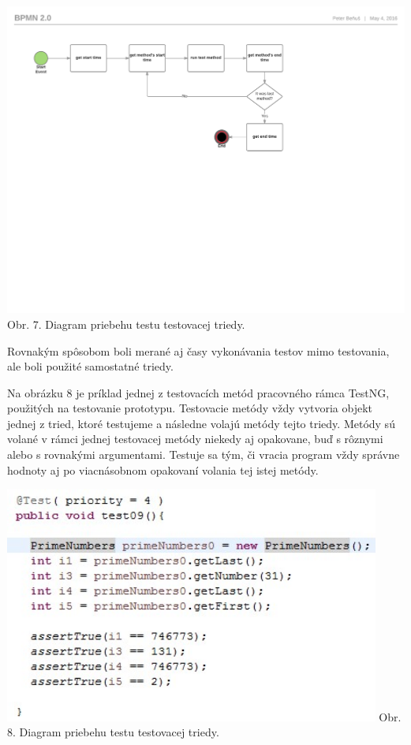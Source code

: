 \documentclass[11pt,twoside,slovak,a4paper]{article}
\begin{document}
 	\begin{center}
 		\includegraphics[width = 500pt, trim = 0pt 315pt 0pt 40pt, clip]{listener}
 		\newline
 		\tiny Obr. 7. Diagram priebehu testu testovacej triedy.
 	\end{center}
 	
 	Rovnakým spôsobom boli merané aj časy vykonávania testov mimo testovania, ale boli použité samostatné triedy.
 	
 	Na obrázku 8 je príklad jednej z testovacích metód pracovného rámca TestNG, použitých na testovanie prototypu. Testovacie metódy vždy vytvoria objekt jednej z tried, ktoré testujeme a následne volajú metódy tejto triedy. Metódy sú volané v rámci jednej testovacej metódy niekedy aj opakovane, buď s rôznymi alebo s rovnakými argumentami. Testuje sa tým, či vracia program vždy správne hodnoty aj po viacnásobnom opakovaní volania tej istej metódy.
 	
 	\begin{center}
 		\includegraphics[width = 350pt]{priklad_testu}
 		\newline
 		\tiny Obr. 8. Diagram priebehu testu testovacej triedy.
 	\end{center}
 	
\end{document}
